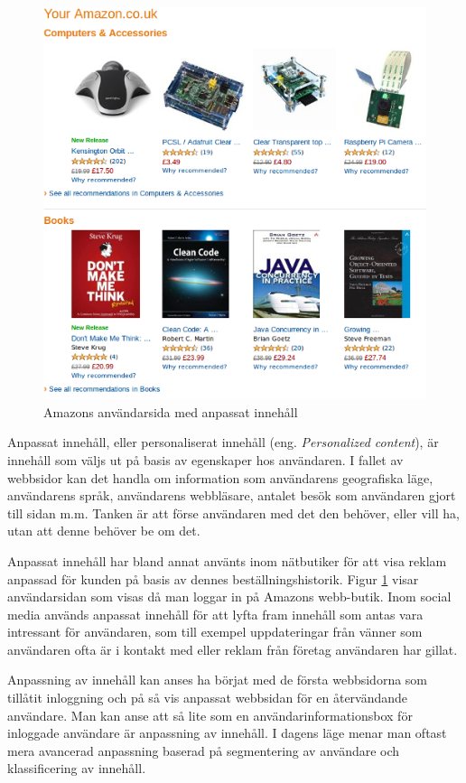 \begin{figure}[h!]
\centering
\includegraphics[width=120mm]{assets/images/amazon.png}
\caption{Amazons användarsida med anpassat innehåll}
\label{amazon}
\end{figure}

Anpassat innehåll, eller personaliserat innehåll (eng. \textit{Personalized content}), är innehåll som väljs ut på basis av egenskaper hos användaren. I fallet av webbsidor kan det handla om information som användarens geografiska läge, användarens språk, användarens webbläsare, antalet besök som användaren gjort till sidan m.m. Tanken är att förse användaren med det den behöver, eller vill ha, utan att denne behöver be om det. \citep{cotacm43}

Anpassat innehåll har bland annat använts inom nätbutiker för att visa reklam anpassad för kunden på basis av dennes beställningshistorik. Figur \ref{amazon} visar användarsidan som visas då man loggar in på Amazons webb-butik. Inom social media används anpassat innehåll för att lyfta fram innehåll som antas vara intressant för användaren, som till exempel uppdateringar från vänner som användaren ofta är i kontakt med eller reklam från företag användaren har gillat. \citep{socialmedia}

Anpassning av innehåll kan anses ha börjat med de första webbsidorna som tillåtit inloggning och på så vis anpassat webbsidan för en återvändande användare. Man kan anse att så lite som en användarinformationsbox för inloggade användare är anpassning av innehåll. I dagens läge menar man oftast mera avancerad anpassning baserad på segmentering av användare och klassificering av innehåll.

